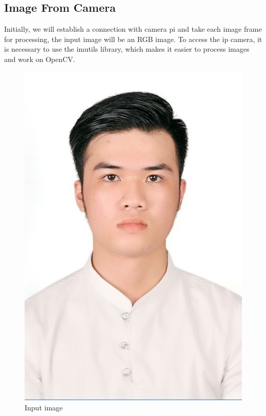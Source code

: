    \subsection{Image From Camera}
    Initially, we will establish a connection with camera pi and take each image frame for processing, the input image will be an RGB image. 
    To access the ip camera, it is necessary to use the imutils library, which makes it easier to process images and work on OpenCV.
    \begin{figure}[H]
        \centering
        \includegraphics[width=0.6\linewidth]{img/1.JPG}
        \caption{Input image}
    \end{figure}

